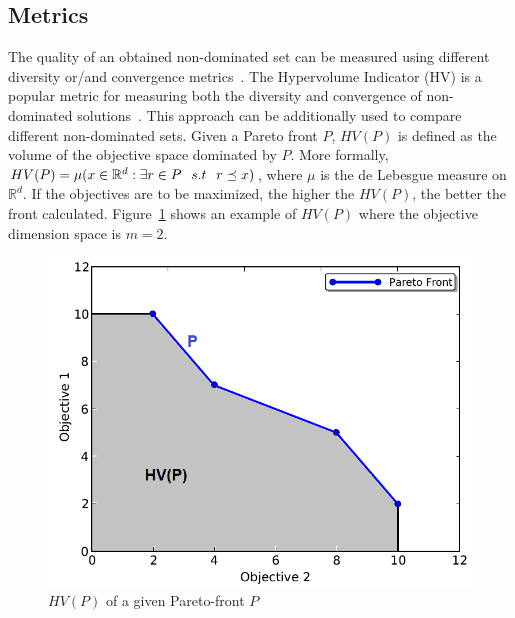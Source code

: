 \documentclass[journal]{IEEEtran}
\begin{document}
\subsection{Metrics}
The quality of an obtained non-dominated set can be measured using different diversity or/and convergence metrics~\cite{Deb2001}. The Hypervolume Indicator (HV) is a popular metric for measuring both the diversity and convergence of non-dominated solutions~\cite{Zitzler-Smetric}. This approach can be additionally used to compare different non-dominated sets. 
Given a Pareto front $P$, $HV(P)$ is defined as the volume of the objective space dominated by $P$. More formally, $HV(P) = \mu (x \in \mathbb{R}^{d} : \exists r \in P \hspace{0.25cm} s.t \hspace{0.25cm} r \preceq x)$, where $\mu$ is the de Lebesgue measure on $\mathbb{R}^{d}$. If the objectives are to be maximized, the higher the $HV(P)$, the better the front calculated. Figure~\ref{fig:hv} shows an example of $HV(P)$ where the objective dimension space is $m=2$.



\begin{figure}[!t]
\begin{center}
\includegraphics[width=0.75\columnwidth]{img/hv}
\end{center}
\caption{$HV(P)$ of a given Pareto-front $P$}
\label{fig:hv}
\end{figure}
\end{document}
